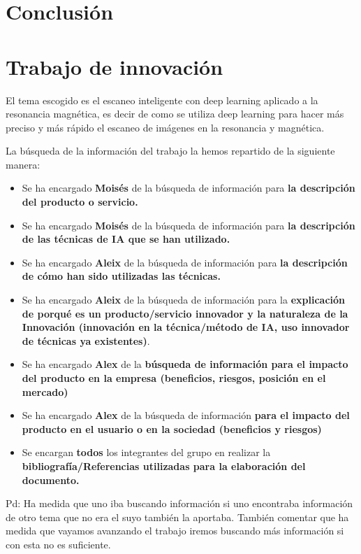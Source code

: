 \section{Conclusión}


\pagebreak
\appendix
\section{Trabajo de innovación}

El tema  escogido es el escaneo inteligente con deep learning aplicado a la resonancia magnética, es decir de como se utiliza deep learning para hacer más preciso  y más rápido el escaneo de imágenes en la resonancia y magnética.

La búsqueda de la información del trabajo la hemos repartido de la siguiente manera:

\begin{itemize}
		\item Se ha encargado \textbf{Moisés} de la búsqueda de información para \textbf{la descripción del producto o servicio.}
		\item Se ha encargado \textbf{Moisés} de la búsqueda de información para \textbf{la descripción de las técnicas de IA que se han utilizado.\textbf{}}
		\item  Se ha encargado \textbf{Aleix} de la búsqueda de información para \textbf{la descripción de cómo han sido utilizadas las técnicas.}
		\item Se ha encargado \textbf{Aleix} de la búsqueda de información para la \textbf{explicación de porqué es un producto/servicio innovador y la naturaleza de la Innovación (innovación en la técnica/método de IA, uso innovador de técnicas ya existentes)}.
		\item Se ha encargado \textbf{Alex} de la \textbf{búsqueda de información para el impacto del producto en la empresa (beneficios, riesgos, posición en el mercado) }
		\item Se ha encargado \textbf{Alex} de la búsqueda de información \textbf{para el impacto del producto en el usuario o en la sociedad (beneficios y riesgos)}
		\item Se encargan \textbf{todos} los integrantes del grupo en realizar la \textbf{bibliografía/Referencias utilizadas para la elaboración del documento.}
\end{itemize}

Pd: Ha medida que uno iba buscando información si uno encontraba información de otro tema que no era el suyo también la aportaba. También comentar que ha medida que vayamos avanzando el trabajo iremos buscando más información si con esta no es suficiente.

